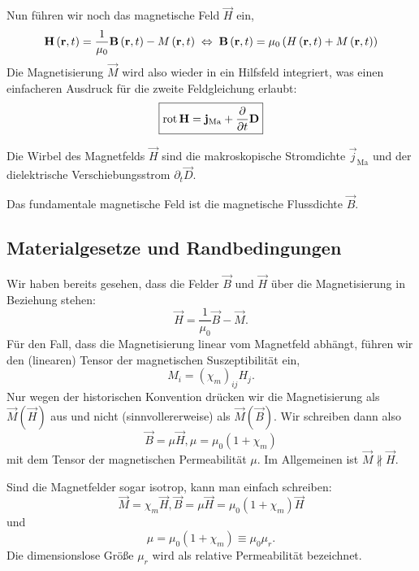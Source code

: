 Nun führen wir noch das magnetische Feld $\vec {H}$ ein,
\begin{equation*}
	\mathbf{H}\left(\mathbf{r},t\right)=\frac{1}{\mu _{0}}\mathbf{B}\left(\mathbf{r},t\right)-M\left(\mathbf{r},t\right)\;\Leftrightarrow\; \mathbf{B}\left(\mathbf{r},t\right)=\mu _{0}\left(H\left(\mathbf{r},t\right)+M\left(\mathbf{r},t\right)\right)
\end{equation*}
Die Magnetisierung $\vec {M}$ wird also wieder in ein Hilfsfeld integriert, was einen einfacheren Ausdruck für die zweite Feldgleichung erlaubt:
\begin{equation*}
	\boxed{\operatorname{rot} \mathbf{H}=\mathbf{j}_{\mathrm{Ma}}+\frac{\partial }{\partial t}\mathbf{D}}
\end{equation*}

\begin{formal}
	Die Wirbel des Magnetfelds $\vec {H}$ sind die makroskopische Stromdichte $\vec {j}_{\mathrm{Ma}}$ und der dielektrische Verschiebungsstrom $\partial _{t}\vec {D}$.
\end{formal}

Das fundamentale magnetische Feld ist die magnetische Flussdichte $\vec {B}$.


\subsection{Materialgesetze und Randbedingungen}

Wir haben bereits gesehen, dass die Felder $\vec {B}$ und $\vec {H}$ über die Magnetisierung in Beziehung stehen:
\begin{equation*}
	\vec {H}=\frac{1}{\mu _{0}}\vec {B}-\vec {M}.
\end{equation*}
Für den Fall, dass die Magnetisierung linear vom Magnetfeld abhängt, führen wir den (linearen) Tensor der magnetischen Suszeptibilität ein,
\begin{equation*}
	M_{i}=\left(\chi _{m}\right)_{ij}H_{j}.
\end{equation*}
Nur wegen der historischen Konvention drücken wir die Magnetisierung als $\vec {M}\left(\vec {H}\right)$ aus und nicht (sinnvollererweise) als $\vec {M}\left(\vec {B}\right)$. Wir schreiben dann also
\begin{equation*}
	\vec {B}=\mu \vec {H}, \mu =\mu _{0}\left(1+\chi _{m}\right)
\end{equation*}
mit dem Tensor der magnetischen Permeabilität $\mu $. Im Allgemeinen ist $\vec {M}\nparallel \vec {H}$.

Sind die Magnetfelder sogar isotrop, kann man einfach schreiben:
\begin{equation*}
	\vec {M}=\chi _{m}\vec {H}, \vec {B}=\mu \vec {H}=\mu _{0}\left(1+\chi _{m}\right)\vec {H}
\end{equation*}
und
\begin{equation*}
	\mu =\mu _{0}\left(1+\chi _{m}\right)\equiv \mu _{0}\mu _{r}.
\end{equation*}
Die dimensionslose Größe $\mu _{r}$ wird als relative Permeabilität bezeichnet.

